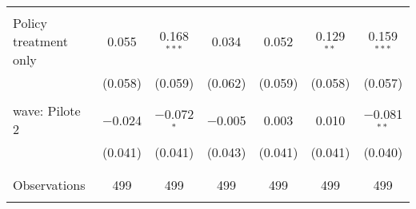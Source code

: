 \begin{tabular}{@{\extracolsep{5pt}}lcccccc}
  & & & & & & \\ 
 Policy treatment only & 0.055 & 0.168$^{***}$ & 0.034 & 0.052 & 0.129$^{**}$ & 0.159$^{***}$ \\ 
  & (0.058) & (0.059) & (0.062) & (0.059) & (0.058) & (0.057) \\ 
  & & & & & & \\ 
 wave: Pilote 2 & $-$0.024 & $-$0.072$^{*}$ & $-$0.005 & 0.003 & 0.010 & $-$0.081$^{**}$ \\ 
  & (0.041) & (0.041) & (0.043) & (0.041) & (0.041) & (0.040) \\ 
  & & & & & & \\ 
\hline \\[-1.8ex] 

Observations & 499 & 499 & 499 & 499 & 499 & 499 \\ 
\hline 
\hline \\[-1.8ex] 
\end{tabular} 